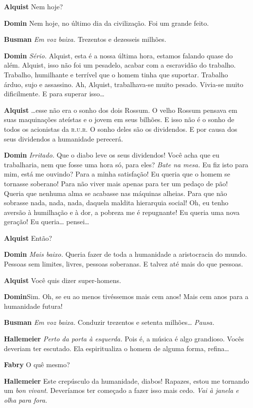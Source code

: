 \textbf{Alquist} Nem hoje?

\textbf{Domin} Nem hoje, no último dia da civilização. Foi um grande feito.

\textbf{Busman} \emph{Em voz baixa.} Trezentos e dezesseis milhões.

\textbf{Domin} \emph{Sério.} Alquist, esta é a nossa última hora, estamos falando
quase do além. Alquist, isso não foi um pesadelo, acabar com a escravidão do
trabalho. Trabalho, humilhante e terrível que o homem tinha que suportar.
Trabalho árduo, sujo e assassino. Ah, Alquist, trabalhava-se muito pesado.
Vivia-se muito dificilmente. E para superar isso\ldots{}

\textbf{Alquist} \ldots{}esse não era o sonho dos dois Rossum. O velho Rossum pensava em 
suas maquinações ateístas e o jovem em seus bilhões. E isso não é o sonho de
todos os acionistas da \textsc{r.u.r.} O sonho deles são os dividendos. E por causa
dos seus dividendos a humanidade perecerá.

\textbf{Domin} \emph{Irritado.} Que o diabo leve os seus dividendos! Você acha que eu
trabalharia, nem que fosse uma hora só, para eles? \emph{Bate na mesa.}
 Eu fiz isto para mim, está me ouvindo? Para a minha satisfação! Eu
queria que o homem se tornasse soberano! Para não viver mais apenas para ter um
pedaço de pão! Queria que nenhuma alma se acabasse nas máquinas alheias. Para
que não sobrasse nada, nada, nada, daquela maldita hierarquia social! Oh, eu
tenho aversão à humilhação e à dor, a pobreza me é repugnante! Eu queria
uma nova geração! Eu queria\ldots{} pensei\ldots{}

\textbf{Alquist} Então?

\textbf{Domin} \emph{Mais baixo.} Queria fazer de toda a humanidade a aristocracia do
mundo. Pessoas sem limites, livres, pessoas soberanas. E talvez até mais do
que pessoas.

\textbf{Alquist} Você quis dizer super-homens.

\textbf{Domin}Sim. Oh, se eu ao menos tivéssemos mais cem anos! Mais cem anos para a
humanidade futura!

\textbf{Busman} \emph{Em voz baixa.} Conduzir trezentos e setenta milhões\ldots{}
\emph{Pausa.}

\textbf{Hallemeier} \emph{Perto da porta à esquerda.} Pois é, a música é algo
grandioso. Vocês deveriam ter escutado. Ela espiritualiza o homem de alguma
forma, refina\ldots{}

\textbf{Fabry} O quê mesmo?

\textbf{Hallemeier} Este crepúsculo da humanidade, diabos! Rapazes, estou me tornando um
\textit{bon vivant}. Deveríamos ter começado a fazer isso mais cedo. \emph{Vai à janela
e olha para fora.}

